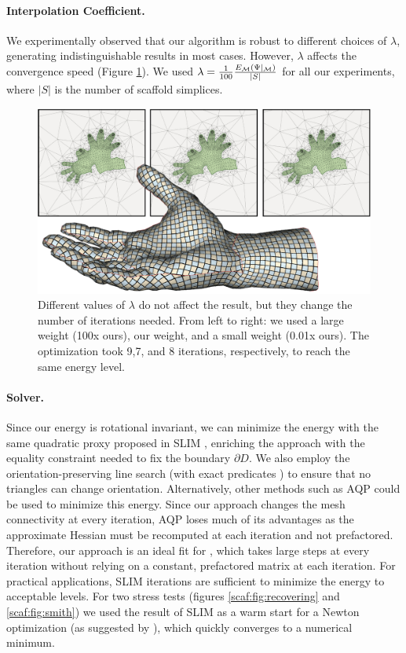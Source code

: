 \paragraph{Interpolation Coefficient.}
We experimentally observed that our algorithm is robust to different choices of $\lambda$, generating indistinguishable results in most cases. However, $\lambda$ affects the convergence speed (Figure \ref{scaf:fig:different_weight}). We used $\lambda = \frac{1}{100}\frac{ E_{\operatorname{\mathcal{M}}}(\Psi|_{\operatorname{\mathcal{M}}})}{|S|}$ for all our experiments, where $|S|$ is the number of scaffold simplices.

\begin{figure}[h!]
\centering
    \includegraphics[width = \columnwidth]{scaf-tex/figs/hand_weight}
\caption{Different values of $\lambda$ do not affect the result, but they change the number of iterations needed. From left to right: we used a large weight (100x ours), our weight, and a small weight (0.01x ours). The optimization took 9,7, and 8 iterations, respectively, to reach the same energy level.}
\label{scaf:fig:different_weight}
\end{figure}

\paragraph{Solver.}
Since our energy is rotational invariant, we can minimize the energy with the same quadratic proxy proposed in SLIM \cite{rabinovich2017scalable}, enriching the approach with the equality constraint needed to fix the boundary $\partial D$. We also employ the orientation-preserving line search \cite{Smith:2015} (with exact predicates \cite{Shewchuk:1996}) to ensure that no triangles can change orientation. Alternatively, other methods such as AQP \cite{Kovalsky:2016} could be used to minimize this energy. Since our approach changes the mesh connectivity at every iteration, AQP loses much of its advantages as the approximate {H}essian must be recomputed at each iteration and not prefactored.  Therefore, our approach is an ideal fit for \cite{rabinovich2017scalable}, which takes large steps at every iteration without relying on a constant, prefactored matrix at each iteration. For practical applications, SLIM iterations are sufficient to minimize the energy to acceptable levels. For two  stress tests (figures \ref{scaf:fig:recovering} and \ref{scaf:fig:smith}) we used the result of SLIM as a warm start for a Newton optimization (as suggested by \cite{rabinovich2017scalable}), which quickly converges to a numerical minimum.

